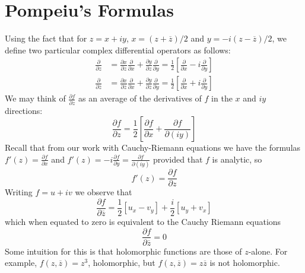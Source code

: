 \documentclass[12pt, a4paper, oneside, openright, titlepage]{book}
\begin{document}
\section{Pompeiu's Formulas}


Using the fact that for $z = x+iy$, $x = (z+\overline{z})/2$ and $y = -i(z-\overline{z})/2$, we define two particular complex differential operators as follows: \begin{align*}
    \frac{\partial}{\partial z} &= \frac{\partial x}{\partial z}\frac{\partial}{\partial x}+\frac{\partial y}{\partial z}\frac{\partial}{\partial y} = \frac{1}{2}\left[\frac{\partial}{\partial x}-i\frac{\partial}{\partial y}\right] \\
    \frac{\partial}{\partial \overline{z}} &= \frac{\partial x}{\partial \overline{z}}\frac{\partial}{\partial x}+\frac{\partial y}{\partial \overline{z}}\frac{\partial}{\partial y} = \frac{1}{2}\left[\frac{\partial}{\partial x}+i\frac{\partial}{\partial y}\right]
\end{align*}
We may think of $\frac{\partial f}{\partial z}$ as an average of the derivatives of $f$ in the $x$ and $iy$ directions: \begin{equation*}
    \frac{\partial f}{\partial z} = \frac{1}{2}\left[\frac{\partial f}{\partial x}+\frac{\partial f}{\partial(iy)}\right]
\end{equation*}
Recall that from our work with Cauchy-Riemann equations we have the formulas $f'(z) = \frac{\partial f}{\partial x}$ and $f'(z) = -i\frac{\partial f}{\partial y} = \frac{\partial f}{\partial(iy)}$ provided that $f$ is analytic, so \begin{equation*}
    f'(z) = \frac{\partial f}{\partial z}
\end{equation*}
Writing $f = u+iv$ we observe that \begin{equation*}
    \frac{\partial f}{\partial \overline{z}} = \frac{1}{2}\left[u_x -v_y\right]+\frac{i}{2}\left[u_y+v_x\right]
\end{equation*}
which when equated to zero is equivalent to the Cauchy Riemann equations \begin{equation*}
    \frac{\partial f}{\partial \overline{z}} = 0
\end{equation*}
Some intuition for this is that holomorphic functions are those of $z$-alone. For example, $f(z,\overline{z}) = z^3$, holomorphic, but $f(z,\overline{z}) = z\overline{z}$ is not holomorphic. 




\end{document}
